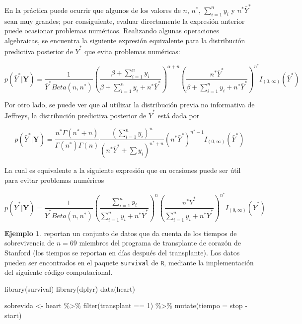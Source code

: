 \documentclass[
  10pt,
  spanish,
]{book}
\newenvironment{Shaded}{\begin{snugshade}}{\end{snugshade}}
\newcommand{\AttributeTok}[1]{\textcolor[rgb]{0.77,0.63,0.00}{#1}}
\newcommand{\DecValTok}[1]{\textcolor[rgb]{0.00,0.00,0.81}{#1}}
\newcommand{\FunctionTok}[1]{\textcolor[rgb]{0.00,0.00,0.00}{#1}}
\newcommand{\NormalTok}[1]{#1}
\newcommand{\OtherTok}[1]{\textcolor[rgb]{0.56,0.35,0.01}{#1}}
\newcommand{\SpecialCharTok}[1]{\textcolor[rgb]{0.00,0.00,0.00}{#1}}
\theoremstyle{definition}
\theoremstyle{definition}
\newtheorem{example}{Ejemplo}[chapter]
\theoremstyle{definition}
\theoremstyle{definition}
\theoremstyle{remark}
\begin{document}
En la práctica puede ocurrir que algunos de los valores de \(n\), \(n^*\), \(\sum_{i=1}^ny_i\) y \(n^*\bar{Y}^*\) sean muy grandes; por consiguiente, evaluar directamente la expresión anterior puede ocasionar problemas numéricos. Realizando algunas operaciones algebraicas, se encuentra la siguiente expresión equivalente para la distribución predictiva posterior de \(\bar{Y}^*\) que evita problemas numéricas:

\begin{equation}
\label{eq:PredExpoInforma2}
p(\bar{Y}^*|\mathbf{Y})=\frac{1}{\bar{Y}^*Beta(n,n^*)}\left(\frac{\beta+\sum_{i=1}^ny_i}{\beta+\sum_{i=1}^ny_i+n^*\bar{Y}^*}\right)^{\alpha+n}\left(\frac{n^*\bar{Y}^*}{\beta+\sum_{i=1}^ny_i+n^*\bar{Y}^*}\right)^{n^*}I_{(0,\infty)}(\bar{Y}^*)
\end{equation}

Por otro lado, se puede ver que al utilizar la distribución previa no informativa de Jeffreys, la distribución predictiva posterior de \(\bar{Y}^*\) está dada por

\begin{equation}
\label{eq:PredExpoJeffreys1}
p(\bar{Y}^*|\mathbf{Y})=\frac{n^*\Gamma(n^*+n)}{\Gamma(n^*)\Gamma(n)}\frac{(\sum_{i=1}^ny_i)^n}{(n^*\bar{Y}^*+\sum y_i)^{n^*+n}}(n^*\bar{Y}^*)^{n^*-1}I_{(0,\infty)}(\bar{Y}^*)
\end{equation}

La cual es equivalente a la siguiente expresión que en ocasiones puede ser útil para evitar problemas numéricos

\begin{equation}
\label{eq:PredExpoJeffreys2}
p(\bar{Y}^*|\mathbf{Y})=\frac{1}{\bar{Y}^*Beta(n,n^*)}\left(\frac{\sum_{i=1}^ny_i}{\sum_{i=1}^ny_i+n^*\bar{Y}^*}\right)^n\left(\frac{n^*\bar{Y}^*}{\sum_{i=1}^ny_i+n^*\bar{Y}^*}\right)^{n^*}I_{(0,\infty)}(\bar{Y}^*)
\end{equation}

\begin{example}
\protect\hypertarget{exm:unnamed-chunk-60}{}{\label{exm:unnamed-chunk-60} }\citet{survi} reportan un conjunto de datos que da cuenta de los tiempos de sobrevivencia de \(n=69\) miembros del programa de transplante de corazón de Stanford (los tiempos se reportan en días después del transplante). Los datos pueden ser encontrados en el paquete \texttt{survival} \citet{survival} de \texttt{R}, mediante la implementación del siguiente código computacional.
\end{example}

\begin{Shaded}
\begin{Highlighting}[]
\FunctionTok{library}\NormalTok{(survival)}
\FunctionTok{library}\NormalTok{(dplyr)}
\FunctionTok{data}\NormalTok{(heart)}

\NormalTok{sobrevida }\OtherTok{\textless{}{-}}\NormalTok{ heart }\SpecialCharTok{\%\textgreater{}\%}
  \FunctionTok{filter}\NormalTok{(transplant }\SpecialCharTok{==} \DecValTok{1}\NormalTok{) }\SpecialCharTok{\%\textgreater{}\%}
  \FunctionTok{mutate}\NormalTok{(}\AttributeTok{tiempo =}\NormalTok{ stop }\SpecialCharTok{{-}}\NormalTok{ start)}
\end{Highlighting}
\end{Shaded}
\end{document}
